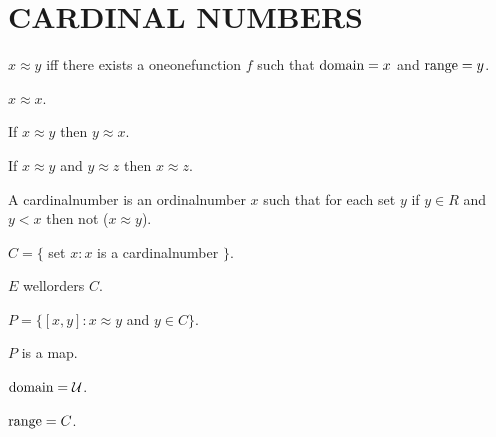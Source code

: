 \documentclass[a4paper,draft]{amsproc}
\begin{document}
\section{CARDINAL NUMBERS}
\begin{forthel}

\begin{definition}[144]
$x \approx y$ iff there exists a oneonefunction $f$ such that $\domain f = x$ and $\range f = y$.
\end{definition}

\begin{theorem}[145]
$x \approx x$.
\end{theorem}

\begin{theorem}[146]
If $x \approx y$ then $y \approx x$.
\end{theorem}

\begin{theorem}[147]
If $x \approx y$ and $y \approx z$ then $x \approx z$.
\end{theorem}

\begin{definition}[148]
A cardinalnumber is an ordinalnumber $x$ such that for each set $y$ if $y \in R$ and $y < x$ then not ($x \approx y$).
\end{definition}

\begin{definition}[149]
$C = \{$ set $x : x$ is a cardinalnumber $\}$.
\end{definition}

\begin{theorem}[150]
$E$ wellorders $C$.
\end{theorem}

\begin{definition}[151]
$P = \{[x,y] : x \approx y$ and $y \in C\}$.
\end{definition}

\begin{theorem}[152a]
$P$ is a map.
\end{theorem}

\begin{theorem}[152b]
$\domain P = \cal{U}$.
\end{theorem}

\begin{theorem}[152c]
$\range P = C$.
\end{theorem}


\end{forthel}
\end{document}
